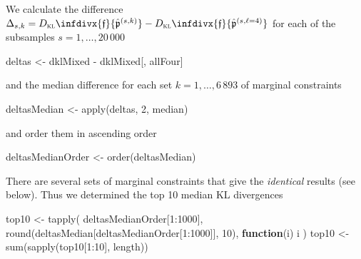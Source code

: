\documentclass[
]{article}
\newenvironment{Shaded}{\begin{snugshade}}{\end{snugshade}}
\newcommand{\ControlFlowTok}[1]{\textcolor[rgb]{0.13,0.29,0.53}{\textbf{#1}}}
\newcommand{\DecValTok}[1]{\textcolor[rgb]{0.00,0.00,0.81}{#1}}
\newcommand{\FunctionTok}[1]{\textcolor[rgb]{0.00,0.00,0.00}{#1}}
\newcommand{\NormalTok}[1]{#1}
\newcommand{\OtherTok}[1]{\textcolor[rgb]{0.56,0.35,0.01}{#1}}
\newcommand{\SpecialCharTok}[1]{\textcolor[rgb]{0.00,0.00,0.00}{#1}}
\newcommand{\prob}[1]{\mathfrak{#1}}
\newcommand{\maxentP}{\hat{\prob p}}
\newcommand{\infdiv}{D_\textsc{kl}\infdivx}
\begin{document}
We calculate the difference
\(\Delta_{s,k} = \infdiv{\prob f}{\maxentP^{(s,k)}} - \infdiv{\prob f}{\maxentP^{(s,\ell = 4)}}\)
for each of the subsamples \(s =1, \ldots, 20\,000\)

\begin{Shaded}
\begin{Highlighting}[]
\NormalTok{deltas }\OtherTok{\textless{}{-}}\NormalTok{ dklMixed }\SpecialCharTok{{-}}\NormalTok{ dklMixed[, allFour]}
\end{Highlighting}
\end{Shaded}

and the median difference for each set \(k = 1, \ldots, 6\,893\) of
marginal constraints

\begin{Shaded}
\begin{Highlighting}[]
\NormalTok{deltasMedian }\OtherTok{\textless{}{-}} \FunctionTok{apply}\NormalTok{(deltas, }\DecValTok{2}\NormalTok{, median)}
\end{Highlighting}
\end{Shaded}

and order them in ascending order

\begin{Shaded}
\begin{Highlighting}[]
\NormalTok{deltasMedianOrder }\OtherTok{\textless{}{-}} \FunctionTok{order}\NormalTok{(deltasMedian)}
\end{Highlighting}
\end{Shaded}

There are several sets of marginal constraints that give the
\emph{identical} results (see below). Thus we determined the top 10
median \textsc{KL} divergences

\begin{Shaded}
\begin{Highlighting}[]
\NormalTok{top10 }\OtherTok{\textless{}{-}} \FunctionTok{tapply}\NormalTok{(}
\NormalTok{    deltasMedianOrder[}\DecValTok{1}\SpecialCharTok{:}\DecValTok{1000}\NormalTok{],}
    \FunctionTok{round}\NormalTok{(deltasMedian[deltasMedianOrder[}\DecValTok{1}\SpecialCharTok{:}\DecValTok{1000}\NormalTok{]], }\DecValTok{10}\NormalTok{),}
    \ControlFlowTok{function}\NormalTok{(i) i}
\NormalTok{)}
\NormalTok{top10 }\OtherTok{\textless{}{-}} \FunctionTok{sum}\NormalTok{(}\FunctionTok{sapply}\NormalTok{(top10[}\DecValTok{1}\SpecialCharTok{:}\DecValTok{10}\NormalTok{], length))}
\end{Highlighting}
\end{Shaded}
\end{document}
